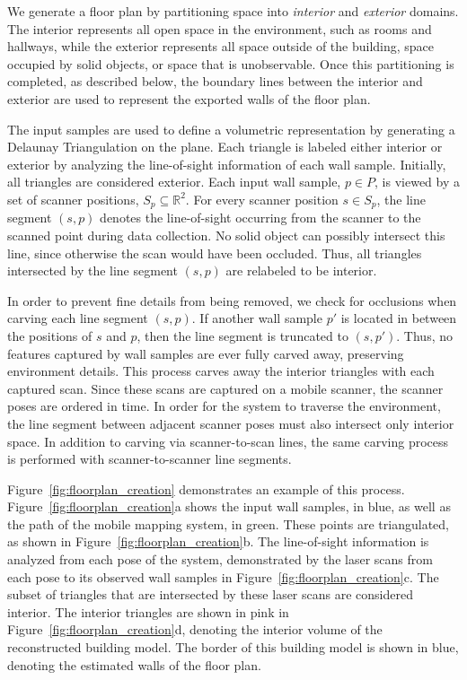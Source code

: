 \documentclass[a4paper,twoside]{article}
\begin{document}
We generate a floor plan by partitioning space into {\it interior} and {\it exterior} domains.  The interior represents all open space in the environment, such as rooms and hallways, while the exterior represents all space outside of the building, space occupied by solid objects, or space that is unobservable.  Once this partitioning is completed, as described below, the boundary lines between the interior and exterior are used to represent the exported walls of the floor plan.

The input samples are used to define a volumetric representation by generating a Delaunay Triangulation on the plane.  Each triangle is labeled either interior or exterior by analyzing the line-of-sight information of each wall sample.  Initially, all triangles are considered exterior.  Each input wall sample, $p \in P$, is viewed by a set of scanner positions, $S_p \subseteq \mathbb{R}^2$.  For every scanner position $s \in S_p$, the line segment $(s,p)$ denotes the line-of-sight occurring from the scanner to the scanned point during data collection.  No solid object can possibly intersect this line, since otherwise the scan would have been occluded.  Thus, all triangles intersected by the line segment $(s,p)$ are relabeled to be interior.

In order to prevent fine details from being removed, we check for occlusions when carving each line segment $(s,p)$.  If another wall sample $p'$ is located in between the positions of $s$ and $p$, then the line segment is truncated to $(s,p')$.  Thus, no features captured by wall samples are ever fully carved away, preserving environment details.  This process carves away the interior triangles with each captured scan.  Since these scans are captured on a mobile scanner, the scanner poses are ordered in time.  In order for the system to traverse the environment, the line segment between adjacent scanner poses must also intersect only interior space.  In addition to carving via scanner-to-scan lines, the same carving process is performed with scanner-to-scanner line segments.

Figure~\ref{fig:floorplan_creation} demonstrates an example of this process.  Figure~\ref{fig:floorplan_creation}a shows the input wall samples, in blue, as well as the path of the mobile mapping system, in green.  These points are triangulated, as shown in Figure~\ref{fig:floorplan_creation}b.  The line-of-sight information is analyzed from each pose of the system, demonstrated by the laser scans from each pose to its observed wall samples in Figure~\ref{fig:floorplan_creation}c.  The subset of triangles that are intersected by these laser scans are considered interior.  The interior triangles are shown in pink in Figure~\ref{fig:floorplan_creation}d, denoting the interior volume of the reconstructed building model.  The border of this building model is shown in blue, denoting the estimated walls of the floor plan.
\end{document}
